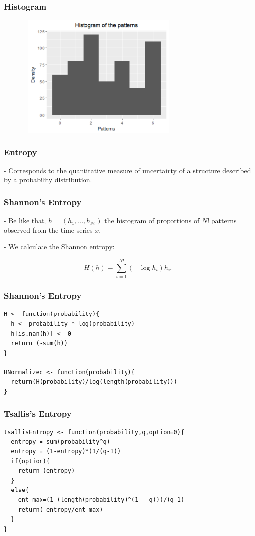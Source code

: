 \documentclass[10pt, compress]{beamer}
\begin{document}
\begin{frame}[fragile]
\frametitle{Histogram}

\begin{figure}
  \centering
   \includegraphics[width=8cm,height=6cm]{Rplot02.pdf}
\end{figure}
\end{frame}

\begin{frame}[fragile]
\frametitle{Entropy}

- Corresponds to the quantitative measure of uncertainty of a structure described by a probability distribution.

\end{frame}

\begin{frame}[fragile]
\frametitle{Shannon's Entropy}

- Be like that, $h=(h_1,\dots,h_{N!})$ the histogram of proportions of $N!$ patterns observed from the time series $x$.

- We calculate the Shannon entropy:

\begin{equation}
 H(h) = \sum_{i=1}^{N!} (-\log h_i) h_i ,
\label{eq:Entropia}
\end{equation}

\end{frame}

\begin{frame}[fragile]
\frametitle{Shannon's Entropy}
 \begin{lstlisting}
H <- function(probability){
  h <- probability * log(probability)
  h[is.nan(h)] <- 0
  return (-sum(h))
}

HNormalized <- function(probability){
  return(H(probability)/log(length(probability)))
}
\end{lstlisting}
\end{frame}


\begin{frame}[fragile]
\frametitle{Tsallis's Entropy}
 \begin{lstlisting}
tsallisEntropy <- function(probability,q,option=0){  
  entropy = sum(probability^q)
  entropy = (1-entropy)*(1/(q-1))
  if(option){
    return (entropy)
  }
  else{
    ent_max=(1-(length(probability)^(1 - q)))/(q-1)
    return( entropy/ent_max)
  }
}
\end{lstlisting}
\end{frame}
\end{document}
